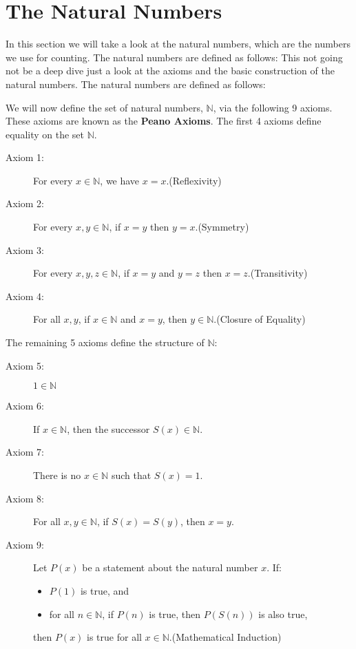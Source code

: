 \section{The Natural Numbers}

In this section we will take a look at the natural numbers, which are the numbers we use for counting. The natural numbers are defined as follows:
This not going not be a deep dive just a look at the axioms and the basic construction of the natural numbers. The natural numbers are defined as follows:

We will now define the set of natural numbers, \( \mathbb{N} \), via the following 9 axioms. These axioms are known as the \textbf{Peano Axioms}. The first 4 axioms define equality on the set \( \mathbb{N} \).

\begin{description}
	\item[Axiom 1:] For every \( x \in \mathbb{N} \), we have \( x = x \).\hfill (Reflexivity)
	\item[Axiom 2:] For every \( x, y \in \mathbb{N} \), if \( x = y \) then \( y = x \).\hfill (Symmetry)
	\item[Axiom 3:] For every \( x, y, z \in \mathbb{N} \), if \( x = y \) and \( y = z \) then \( x = z \).\hfill (Transitivity)
	\item[Axiom 4:] For all \( x, y \), if \( x \in \mathbb{N} \) and \( x = y \), then \( y \in \mathbb{N} \).\hfill (Closure of Equality)
\end{description}

The remaining 5 axioms define the structure of \( \mathbb{N} \):

\begin{description}
	\item[Axiom 5:] \( 1 \in \mathbb{N} \)
	\item[Axiom 6:] If \( x \in \mathbb{N} \), then the successor \( S(x) \in \mathbb{N} \).
	\item[Axiom 7:] There is no \( x \in \mathbb{N} \) such that \( S(x) = 1 \).
	\item[Axiom 8:] For all \( x, y \in \mathbb{N} \), if \( S(x) = S(y) \), then \( x = y \).
	\item[Axiom 9:] Let \( P(x) \) be a statement about the natural number \( x \). If:
		\begin{itemize}
			\item \( P(1) \) is true, and
			\item for all \( n \in \mathbb{N} \), if \( P(n) \) is true, then \( P(S(n)) \) is also true,
		\end{itemize}
		then \( P(x) \) is true for all \( x \in \mathbb{N} \).\hfill (Mathematical Induction)
\end{description}

